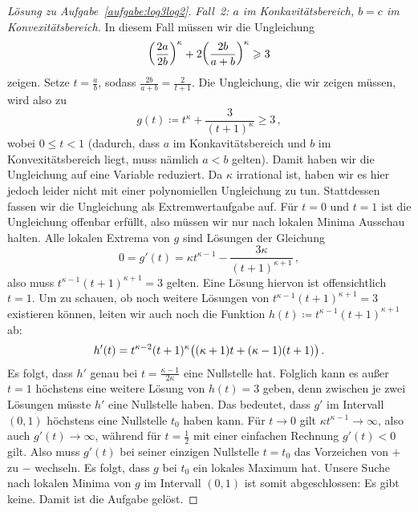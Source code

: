 \begin{proof}[Lösung zu Aufgabe~\ref{aufgabe:log3log2}]
	\emph{Fall~2: $a$ im Konkavitätsbereich, $b=c$ im Konvexitätsbereich.} In diesem Fall müssen wir die Ungleichung
	\begin{equation*}
		\parens*{\frac{2a}{2b}}^\kappa+2\parens*{\frac{2b}{a+b}}^\kappa\geqslant 3
	\end{equation*}
	zeigen. Setze $t=\frac ab$, sodass $\frac{2b}{a+b}=\frac{2}{t+1}$. Die Ungleichung, die wir zeigen müssen, wird also zu
	\begin{equation*}
		g(t)\coloneqq t^\kappa+\frac{3}{(t+1)^\kappa}\geqslant 3\,,
	\end{equation*}
	wobei $0\leqslant t<1$ (dadurch, dass $a$ im Konkavitätsbereich und $b$ im Konvexitätsbereich liegt, muss nämlich $a<b$ gelten). Damit haben wir die Ungleichung auf eine Variable reduziert. Da $\kappa$ irrational ist, haben wir es hier jedoch leider nicht mit einer polynomiellen Ungleichung zu tun. Stattdessen fassen wir die Ungleichung als Extremwertaufgabe auf. Für $t=0$ und $t=1$ ist die Ungleichung offenbar erfüllt, also müssen wir nur nach lokalen Minima Ausschau halten. Alle lokalen Extrema von $g$ sind Lösungen der Gleichung
	\begin{equation*}
		0=g'(t)=\kappa t^{\kappa-1}-\frac{3\kappa}{(t+1)^{\kappa+1}}\,,
	\end{equation*}
	also muss $t^{\kappa-1}(t+1)^{\kappa+1}=3$ gelten. Eine Lösung hiervon ist offensichtlich $t=1$. Um zu schauen, ob noch weitere Lösungen von $t^{\kappa-1}(t+1)^{\kappa+1}=3$ existieren können, leiten wir auch noch die Funktion $h(t)\coloneqq t^{\kappa-1} (t+1)^{\kappa+1}$ ab:
	\begin{equation*}
		h'(t)=t^{\kappa-2}(t+1)^\kappa\parens[\big]{(\kappa+1)t+(\kappa-1)(t+1)}\,.
	\end{equation*}
	Es folgt, dass $h'$ genau bei $t=\frac{\kappa-1}{2\kappa}$ eine Nullstelle hat. Folglich kann es außer $t=1$ höchstens eine weitere Lösung von $h(t)=3$ geben, denn zwischen je zwei Lösungen müsste $h'$ eine Nullstelle haben. Das bedeutet, dass $g'$ im Intervall $(0,1)$ höchstens eine Nullstelle $t_0$ haben kann. Für $t\rightarrow 0$ gilt $\kappa t^{\kappa-1}\rightarrow \infty$, also auch $g'(t)\rightarrow \infty$, während für $t=\frac12$ mit einer einfachen Rechnung $g'(t)<0$ gilt. Also muss $g'(t)$ bei seiner einzigen Nullstelle $t=t_0$ das Vorzeichen von $+$ zu $-$ wechseln. Es folgt, dass $g$ bei $t_0$ ein lokales Maximum hat. Unsere Suche nach lokalen Minima von $g$ im Intervall $(0,1)$ ist somit abgeschlossen: Es gibt keine. Damit ist die Aufgabe gelöst.
\end{proof}

